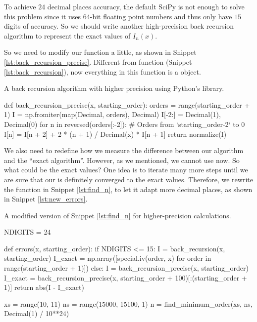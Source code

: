 \Answer To achieve \(24\) decimal places accuracy, the default SciPy 
is not enough to solve this problem since it uses \(64\)-bit floating point numbers
and thus only have \(15\) digits of accuracy.
So we should write another high-precision back recursion algorithm to represent the exact
values of \(I_n(x)\).

So we need to modify our  function a little, as shown in Snippet
\ref{lst:back_recursion_precise}. Different from function 
(Snippet \ref{lst:back_recursion}), now everything in this function is a 
object.

\begin{algorithm}[H]
    \caption{A back recursion algorithm with higher precision using Python's  library.}
    \label{lst:back_recursion_precise}
    \begin{pythoncode}
        def back_recursion_precise(x, starting_order):
            orders = range(starting_order + 1)
            I = np.fromiter(map(Decimal, orders), Decimal)
            I[-2:] = Decimal(1), Decimal(0)
            for n in reversed(orders[:-2]):  # Orders from `starting_order-2` to 0
                I[n] = I[n + 2] + 2 * (n + 1) / Decimal(x) * I[n + 1]
            return normalize(I)
        \end{pythoncode}
\end{algorithm}

We also need to redefine how we measure the difference between our algorithm and the
``exact algorithm''. However, as we mentioned, we cannot use  now.
So what could be the exact values?
One idea is to iterate many more steps until we are sure that our
 is definitely converged to the exact values.
Therefore, we rewrite the function  in Snippet \ref{lst:find_n},
to let it adapt more decimal places, as shown in Snippet \ref{lst:new_errors}.

\begin{algorithm}
    \caption{A modified version of Snippet \ref{lst:find_n} for higher-precision calculations.}
    \label{lst:new_errors}
    \begin{pythoncode}
        NDIGITS = 24


        def errors(x, starting_order):
            if NDIGITS <= 15:
                I = back_recursion(x, starting_order)
                I_exact = np.array([special.iv(order, x) for order in range(starting_order + 1)])
            else:
                I = back_recursion_precise(x, starting_order)
                I_exact = back_recursion_precise(x, starting_order + 100)[:(starting_order + 1)]
            return abs(I - I_exact)


        xs = range(10, 11)
        ns = range(15000, 15100, 1)
        n = find_minimum_order(xs, ns, Decimal(1) / 10**24)
    \end{pythoncode}
\end{algorithm}

